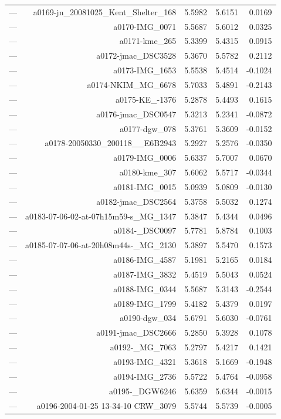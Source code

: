 \begin{table}[htbp]
\begin{tabular}{lrrrr}
— & a0169-jn_20081025_Kent_Shelter_168 & 5.5982 & 5.6151 & 0.0169 \\
— & a0170-IMG_0071 & 5.5687 & 5.6012 & 0.0325 \\
— & a0171-kme_265 & 5.3399 & 5.4315 & 0.0915 \\
— & a0172-jmac_DSC3528 & 5.3670 & 5.5782 & 0.2112 \\
— & a0173-IMG_1653 & 5.5538 & 5.4514 & -0.1024 \\
— & a0174-NKIM_MG_6678 & 5.7033 & 5.4891 & -0.2143 \\
— & a0175-KE_-1376 & 5.2878 & 5.4493 & 0.1615 \\
— & a0176-jmac_DSC0547 & 5.3213 & 5.2341 & -0.0872 \\
— & a0177-dgw_078 & 5.3761 & 5.3609 & -0.0152 \\
— & a0178-20050330_200118__E6B2943 & 5.2927 & 5.2576 & -0.0350 \\
— & a0179-IMG_0006 & 5.6337 & 5.7007 & 0.0670 \\
— & a0180-kme_307 & 5.6062 & 5.5717 & -0.0344 \\
— & a0181-IMG_0015 & 5.0939 & 5.0809 & -0.0130 \\
— & a0182-jmac_DSC2564 & 5.3758 & 5.5032 & 0.1274 \\
— & a0183-07-06-02-at-07h15m59-s_MG_1347 & 5.3847 & 5.4344 & 0.0496 \\
— & a0184-_DSC0097 & 5.7781 & 5.8784 & 0.1003 \\
— & a0185-07-07-06-at-20h08m44s-_MG_2130 & 5.3897 & 5.5470 & 0.1573 \\
— & a0186-IMG_4587 & 5.1981 & 5.2165 & 0.0184 \\
— & a0187-IMG_3832 & 5.4519 & 5.5043 & 0.0524 \\
— & a0188-IMG_0344 & 5.5687 & 5.3143 & -0.2544 \\
— & a0189-IMG_1799 & 5.4182 & 5.4379 & 0.0197 \\
— & a0190-dgw_034 & 5.6791 & 5.6030 & -0.0761 \\
— & a0191-jmac_DSC2666 & 5.2850 & 5.3928 & 0.1078 \\
— & a0192-_MG_7063 & 5.2797 & 5.4217 & 0.1421 \\
— & a0193-IMG_4321 & 5.3618 & 5.1669 & -0.1948 \\
— & a0194-IMG_2736 & 5.5722 & 5.4764 & -0.0958 \\
— & a0195-_DGW6246 & 5.6359 & 5.6344 & -0.0015 \\
— & a0196-2004-01-25 13-34-10 CRW_3079 & 5.5744 & 5.5739 & -0.0005 \\

\end{tabular}
\end{table}
